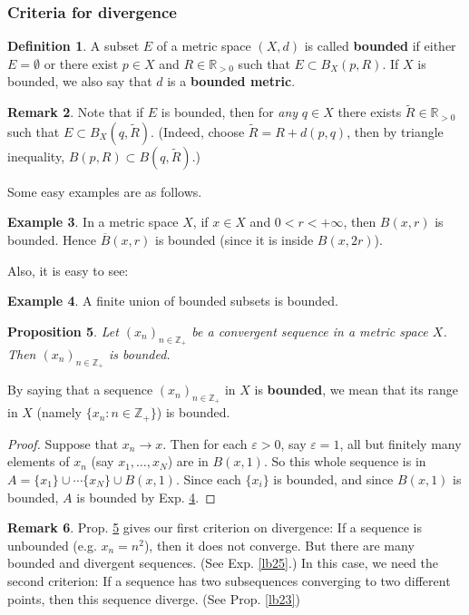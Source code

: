 \documentclass[12pt,b5paper,notitlepage]{article}
\theoremstyle{definition}
\newtheorem{df}{Definition}[section]
\newtheorem{eg}[df]{Example}
\newtheorem{rem}[df]{Remark}
\theoremstyle{plain}
\newtheorem{pp}[df]{Proposition}
\newcommand{\wtd}{\widetilde}
\newcommand{\ovl}{\overline}
\newcommand{\Zbb}{\mathbb Z}
\newcommand{\Rbb}{\mathbb R}
\numberwithin{equation}{section}
\begin{document}
\subsubsection{Criteria for divergence}

\begin{df}
A subset $E$ of a metric space $(X,d)$ is called  \textbf{bounded} if either $E=\emptyset$ or there exist $p\in X$ and $R\in\Rbb_{>0}$ such that $E\subset B_X(p,R)$. If $X$ is bounded, we also say that $d$ is a \textbf{bounded metric}. 
\end{df}

\begin{rem}
Note that if $E$ is bounded, then  for \emph{any} $q\in X$ there exists $\wtd R\in\Rbb_{>0}$ such that $E\subset B_X(q,\wtd R)$. (Indeed, choose $\wtd R=R+d(p,q)$, then by triangle inequality, $B(p,R)\subset B(q,\wtd R)$.)
\end{rem}

Some easy examples are as follows.
\begin{eg}
In a metric space $X$, if $x\in X$ and $0<r<+\infty$, then $B(x,r)$ is bounded. Hence $\ovl B(x,r)$ is bounded (since it is inside $B(x,2r)$).
\end{eg}



Also, it is easy to see:
\begin{eg}\label{lb22}
A finite union of bounded subsets is bounded.
\end{eg}

\begin{pp}\label{lb24}
Let $(x_n)_{n\in\Zbb_+}$ be a convergent sequence in a metric space $X$. Then $(x_n)_{n\in\Zbb_+}$ is bounded.
\end{pp}

By saying that a sequence  $(x_n)_{n\in\Zbb_+}$ in $X$ is \textbf{bounded}, we mean that its range in $X$ (namely $\{x_n:n\in\Zbb_+\}$) is bounded.

\begin{proof}
Suppose that $x_n\rightarrow x$. Then for each $\varepsilon>0$, say $\varepsilon=1$, all but finitely many elements of $x_n$ (say $x_1,\dots,x_N$) are in $B(x,1)$. So this whole sequence is in $A=\{x_1\}\cup\cdots\{x_N\}\cup B(x,1)$. Since each $\{x_i\}$ is bounded, and since $B(x,1)$ is bounded, $A$ is bounded by Exp. \ref{lb22}.
\end{proof}


\begin{rem}\label{lb26}
Prop. \ref{lb24} gives our first criterion on divergence: If a sequence is unbounded (e.g. $x_n=n^2$), then it does not converge. But there are many bounded and divergent sequences. (See Exp. \ref{lb25}.) In this case, we need the second criterion: If a sequence has two subsequences converging to two different points, then this sequence diverge. (See Prop. \ref{lb23})
\end{rem}
\end{document}
